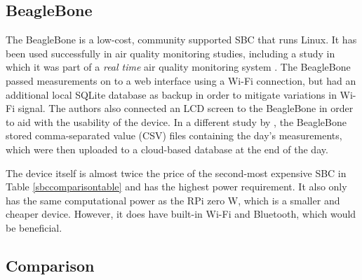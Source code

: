 \documentclass[11pt]{report}
\begin{document}
\subsection{BeagleBone}

The BeagleBone is a low-cost, community supported SBC that runs Linux. It has been used successfully in air quality monitoring studies, including a study in which it was part of a \textit{real time} air quality monitoring system \citep{Min2014airfeedbeagle}. The BeagleBone passed measurements on to a web interface using a Wi-Fi connection, but had an additional local SQLite database as backup in order to mitigate variations in Wi-Fi signal. The authors also connected an LCD screen to the BeagleBone in order to aid with the usability of the device. In a different study by \cite{Desai2017beagleboneblack}, the BeagleBone stored comma-separated value (CSV) files containing the day's measurements, which were then uploaded to a cloud-based database at the end of the day. 

The device itself is almost twice the price of the second-most expensive SBC in Table \ref{sbccomparisontable} and has the highest power requirement. It also only has the same computational power as the RPi zero W, which is a smaller and cheaper device. However, it does have built-in Wi-Fi and Bluetooth, which would be beneficial.

\subsection{Comparison} \label{sbccomparison}
\end{document}
